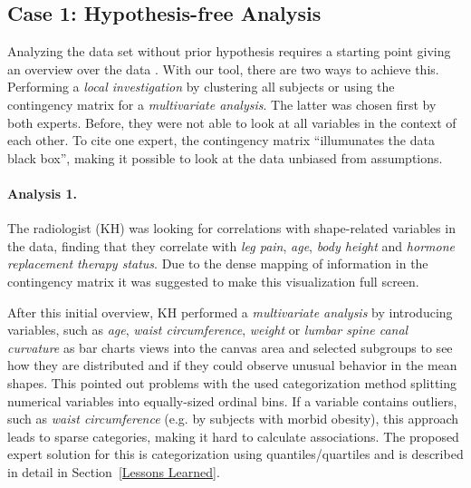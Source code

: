 \documentclass[journal]{style/vgtc} 			          %
\begin{document}
\subsection{Case 1: Hypothesis-free Analysis} \label{Hypothesis-free analysis}
Analyzing the data set without prior hypothesis requires a starting point giving an overview over the data \cite{Shneiderman1996}.
%
With our tool, there are two ways to achieve this.
%
Performing a \emph{local investigation} by clustering all subjects or using the contingency matrix for a \emph{multivariate analysis}.
%
The latter was chosen first by both experts.
%
Before, they were not able to look at all variables in the context of each other.
%
%
To cite one expert, the contingency matrix ``illumunates the data black box'', making it possible to look at the data unbiased from assumptions.

\paragraph{Analysis 1.}
%
The radiologist (KH) was looking for correlations with shape-related variables in the data, finding that they correlate with \emph{leg pain}, \emph{age}, \emph{body height} and \emph{hormone replacement therapy status}.
%
Due to the dense mapping of information in the contingency matrix it was suggested to make this visualization full screen.

After this initial overview, KH performed a \emph{multivariate analysis} by introducing variables, such as \emph{age}, \emph{waist circumference}, \emph{weight} or \emph{lumbar spine canal curvature} as bar charts views into the canvas area and selected subgroups to see how they are distributed and if they could observe unusual behavior in the mean shapes.
%
This pointed out problems with the used categorization method splitting numerical variables into equally-sized ordinal bins.
%
If a variable contains outliers, such as \emph{waist circumference} (e.g. by subjects with morbid obesity), this approach leads to sparse categories, making it hard to calculate associations.
%
The proposed expert solution for this is categorization using quantiles/quartiles and is described in detail in Section~\ref{Lessons Learned}.
\end{document}
